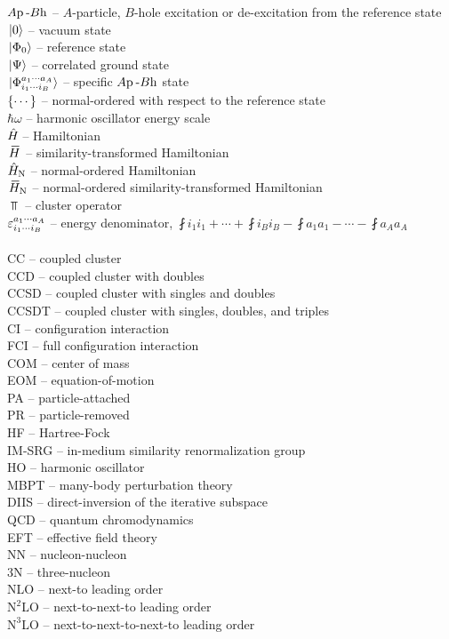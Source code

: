 \documentclass[thesis.tex]{subfiles}
\begin{document}
\noindent
$A\mathrm{p}\hspace{2pt}\text{-}B\mathrm{h}$ -- $A$-particle, $B$-hole excitation or de-excitation from the reference state \\
$\hspace{1pt}\lvert 0 \rangle$ -- vacuum state \\
$\hspace{1pt}\lvert \Phi_{0} \rangle$ -- reference state \\
$\hspace{1pt}\lvert \Psi \rangle$ -- correlated ground state \\
$\hspace{1pt}\lvert \Phi^{a_{1}\cdots a_{A}}_{i_{1}\cdots i_{B}} \rangle$ -- specific $A\mathrm{p}\hspace{2pt}\text{-}B\mathrm{h}$ state \\
$\left\{\cdots\right\}$ -- normal-ordered with respect to the reference state \\
$\hbar\omega$ -- harmonic oscillator energy scale \\
$\hat{H}\hspace{-1pt}$ -- Hamiltonian \\
$\EHam$ -- similarity-transformed Hamiltonian \\
$\hat{H}_{\mathrm{N}}$ -- normal-ordered Hamiltonian \\
$\EHamN$ -- normal-ordered similarity-transformed Hamiltonian \\
$\Top$ -- cluster operator \\
$\varepsilon^{a_{1}\cdots a_{A}}_{i_{1}\cdots i_{B}}$ -- energy denominator, $\fint{i_{1}}{i_{1}} + \cdots + \fint{i_{B}}{i_{B}} - \fint{a_{1}}{a_{1}} - \cdots - \fint{a_{A}}{a_{A}}$ \\

\\

\noindent
CC -- coupled cluster \\
CCD -- coupled cluster with doubles \\
CCSD -- coupled cluster with singles and doubles \\
CCSDT -- coupled cluster with singles, doubles, and triples \\
CI -- configuration interaction \\
FCI -- full configuration interaction \\
COM -- center of mass \\
EOM -- equation-of-motion \\
PA -- particle-attached \\
PR -- particle-removed \\
HF -- Hartree-Fock \\
IM-SRG -- in-medium similarity renormalization group \\
HO -- harmonic oscillator \\
MBPT -- many-body perturbation theory \\
DIIS -- direct-inversion of the iterative subspace \\
QCD -- quantum chromodynamics \\
EFT -- effective field theory \\
NN -- nucleon-nucleon \\
3N -- three-nucleon \\
NLO -- next-to leading order \\
$\text{N}^{2}$LO -- next-to-next-to leading order \\
$\text{N}^{3}$LO -- next-to-next-to-next-to leading order
\end{document}
